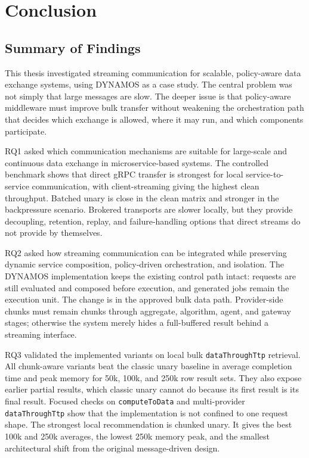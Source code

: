 \chapter{Conclusion}\label{ch:conclusion}

\section{Summary of Findings}

This thesis investigated streaming communication for scalable, policy-aware data exchange systems, using DYNAMOS as a case study. The central problem was not simply that large messages are slow. The deeper issue is that policy-aware middleware must improve bulk transfer without weakening the orchestration path that decides which exchange is allowed, where it may run, and which components participate.

RQ1 asked which communication mechanisms are suitable for large-scale and continuous data exchange in microservice-based systems. The controlled benchmark shows that direct gRPC transfer is strongest for local service-to-service communication, with client-streaming giving the highest clean throughput. Batched unary is close in the clean matrix and stronger in the backpressure scenario. Brokered transports are slower locally, but they provide decoupling, retention, replay, and failure-handling options that direct streams do not provide by themselves.

RQ2 asked how streaming communication can be integrated while preserving dynamic service composition, policy-driven orchestration, and isolation. The DYNAMOS implementation keeps the existing control path intact: requests are still evaluated and composed before execution, and generated jobs remain the execution unit. The change is in the approved bulk data path. Provider-side chunks must remain chunks through aggregate, algorithm, agent, and gateway stages; otherwise the system merely hides a full-buffered result behind a streaming interface.

RQ3 validated the implemented variants on local bulk \texttt{dataThroughTtp} retrieval. All chunk-aware variants beat the classic unary baseline in average completion time and peak memory for 50k, 100k, and 250k row result sets. They also expose earlier partial results, which classic unary cannot do because its first result is its final result. Focused checks on \texttt{computeToData} and multi-provider \texttt{dataThroughTtp} show that the implementation is not confined to one request shape. The strongest local recommendation is chunked unary. It gives the best 100k and 250k averages, the lowest 250k memory peak, and the smallest architectural shift from the original message-driven design.

